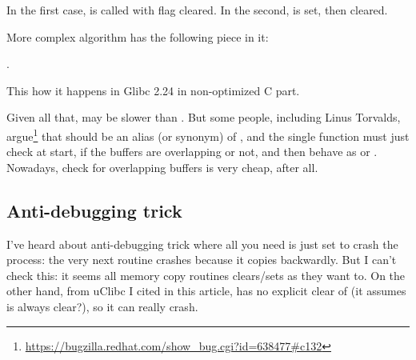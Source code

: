 In the first case,  is called with  flag cleared.
In the second,  is set, then cleared.

More complex algorithm has the following piece in it:

.

This how it happens in Glibc 2.24 in non-optimized C part.

Given all that,  may be slower than .
But some people, including Linus Torvalds, argue\footnote{\url{https://bugzilla.redhat.com/show_bug.cgi?id=638477\#c132}}
that  should be an alias (or synonym) of , and the single
function must just check at start, if the buffers are overlapping or not, and then behave as  or .
Nowadays, check for overlapping buffers is very cheap, after all.

\subsection{Anti-debugging trick}

I've heard about anti-debugging trick where all you need is just set  to crash the process: the very next 
routine crashes because it copies backwardly.
But I can't check this: it seems all memory copy routines clears/sets  as they want to.
On the other hand,  from uClibc I cited in this article,
has no explicit clear of  (it assumes  is always clear?),
so it can really crash.

